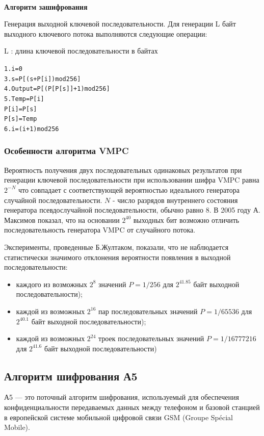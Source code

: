 \documentclass[a4paper]{report}
\begin{document}
~

\textbf{Алгоритм зашифрования}

Генерация выходной ключевой последовательности.
Для генерации L байт выходного ключевого потока выполняются следующие операции: 

L : длина ключевой последовательности в байтах

\begin{alltt}
1. i = 0
	3. s = P[(s + P[i]) mod 256]
	4. Output = P[(P[P[s]] + 1) mod 256]
	5. Temp = P[i]
  	   P[i] = P[s]
  	   P[s] = Temp
	6. i = (i + 1) mod 256
\end{alltt}

\subsubsection{Особенности алгоритма VMPC}
Вероятность получения двух последовательных одинаковых результатов при генерации ключевой последовательности при использовании шифра VMPC равна $2^{-N}$ что совпадает с соответствующей вероятностью идеального генератора случайной последовательности.  $N$ -  число разрядов внутреннего состояния генератора псевдослучайной последовательности, обычно равно $8$. В 2005 году А. Максимов показал, что на основании $2^{40}$ выходных бит возможно отличить последовательность генератора VMPC от случайного потока.

 Эксперименты, проведенные Б.Жултаком, показали, что не наблюдается статистически значимого отклонения вероятности появления в выходной последовательности:
\begin{itemize}
\item каждого из возможных $2^{8}$  значений $P=1/256$  для $2^{41.85}$  байт выходной последовательности);
\item каждой из возможных $2^{16}$ пар последовательных значений $P=1/65536$ для $2^{40.1}$ байт выходной последовательности);
\item каждой из возможных $2^{24}$ троек последовательных значений $P=1/16777216$ для $2^{41.6}$ байт выходной последовательности)
\end{itemize}

\subsection{Алгоритм шифрования А5}

А5 — это поточный алгоритм шифрования, используемый для обеспечения конфиденциальности передаваемых данных между телефоном и базовой станцией в европейской системе мобильной цифровой связи GSM (Groupe Spécial Mobile).
\end{document}
